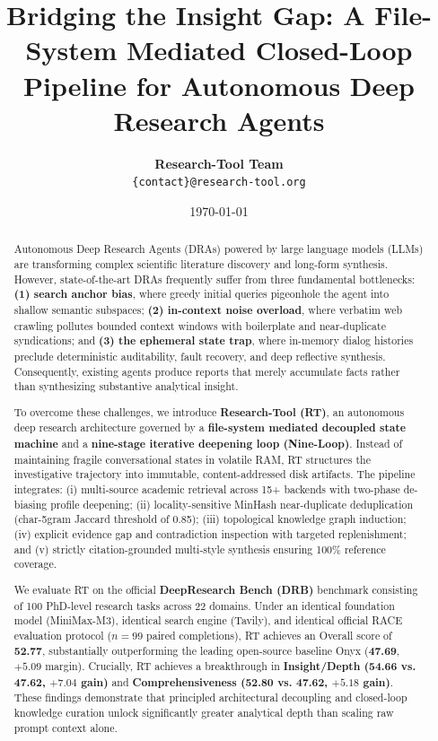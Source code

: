 \documentclass[11pt,a4paper]{article}
\title{\textbf{Bridging the Insight Gap: A File-System Mediated Closed-Loop Pipeline for Autonomous Deep Research Agents}}
\author{
  \textbf{Research-Tool Team} \\
  \texttt{\{contact\}@research-tool.org}
}
\date{\today}
\begin{document}
\maketitle

\begin{abstract}
Autonomous Deep Research Agents (DRAs) powered by large language models (LLMs) are transforming complex scientific literature discovery and long-form synthesis. However, state-of-the-art DRAs frequently suffer from three fundamental bottlenecks: \textbf{(1) search anchor bias}, where greedy initial queries pigeonhole the agent into shallow semantic subspaces; \textbf{(2) in-context noise overload}, where verbatim web crawling pollutes bounded context windows with boilerplate and near-duplicate syndications; and \textbf{(3) the ephemeral state trap}, where in-memory dialog histories preclude deterministic auditability, fault recovery, and deep reflective synthesis. Consequently, existing agents produce reports that merely accumulate facts rather than synthesizing substantive analytical insight.

To overcome these challenges, we introduce \textbf{Research-Tool (RT)}, an autonomous deep research architecture governed by a \textbf{file-system mediated decoupled state machine} and a \textbf{nine-stage iterative deepening loop (Nine-Loop)}. Instead of maintaining fragile conversational states in volatile RAM, RT structures the investigative trajectory into immutable, content-addressed disk artifacts. The pipeline integrates: (i) multi-source academic retrieval across 15+ backends with two-phase de-biasing profile deepening; (ii) locality-sensitive MinHash near-duplicate deduplication (char-5gram Jaccard threshold of 0.85); (iii) topological knowledge graph induction; (iv) explicit evidence gap and contradiction inspection with targeted replenishment; and (v) strictly citation-grounded multi-style synthesis ensuring 100\% reference coverage.

We evaluate RT on the official \textbf{DeepResearch Bench (DRB)} benchmark consisting of 100 PhD-level research tasks across 22 domains. Under an identical foundation model (MiniMax-M3), identical search engine (Tavily), and identical official RACE evaluation protocol ($n=99$ paired completions), RT achieves an Overall score of \textbf{52.77}, substantially outperforming the leading open-source baseline Onyx (\textbf{47.69}, $+5.09$ margin). Crucially, RT achieves a breakthrough in \textbf{Insight/Depth (54.66 vs. 47.62, $+7.04$ gain)} and \textbf{Comprehensiveness (52.80 vs. 47.62, $+5.18$ gain)}. These findings demonstrate that principled architectural decoupling and closed-loop knowledge curation unlock significantly greater analytical depth than scaling raw prompt context alone.
\end{abstract}
\end{document}
